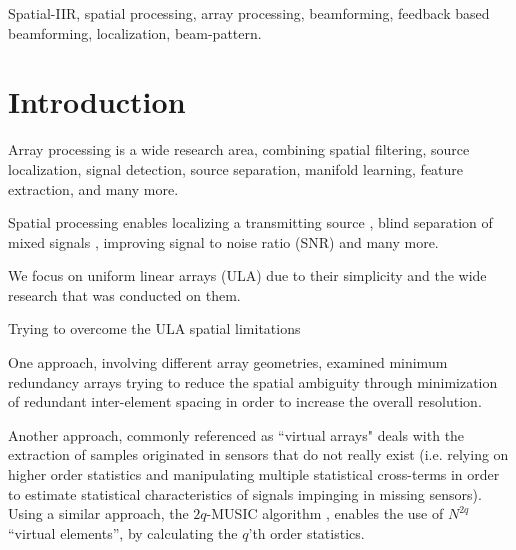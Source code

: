 \documentclass[conference]{IEEEtran}
\begin{document}
\begin{IEEEkeywords}
Spatial-IIR, spatial processing, array processing, beamforming, feedback based beamforming, localization, beam-pattern.
\end{IEEEkeywords}

\section{Introduction}
Array processing is a wide research area, combining spatial filtering, source localization, signal detection, source separation, manifold learning, feature extraction, and many more.
\par Spatial processing enables localizing a transmitting source \cite{skolnik2008radar}, blind separation of mixed signals \cite{Comon1994IndependentConcept}, improving signal to noise ratio (SNR) \cite{Frost1972AProcessing,verdu1998multiuser} and many more.
\par We focus on uniform linear arrays (ULA) due to their simplicity and the wide research that was conducted on them.
\par Trying to overcome the ULA spatial limitations 
\par One approach, involving different array geometries, examined minimum redundancy arrays \cite{Moffet1968Minimum-RedundancyArrays,Pillai1985AEstimation,UnnikrishnaPillai1987StatisticalMatrix} trying to reduce the spatial ambiguity through minimization of redundant inter-element spacing in order to increase the overall resolution. 
\par Another approach, commonly referenced as ``virtual arrays" \cite{Pal2010NestedFreedom,Chevalier2005OnProcessing,Mendel1999ApplicationsProcessing} deals with the extraction of samples originated in sensors that do not really exist (i.e. relying on higher order statistics and manipulating multiple statistical cross-terms in order to estimate statistical characteristics of signals impinging in missing sensors). 
Using a similar approach, the $2q$-MUSIC algorithm \cite{Chevalier2006High-resolutionAlgorithm} , enables the use of $N^{2q}$ ``virtual elements'', by calculating the $q$'th order statistics. 
\end{document}
